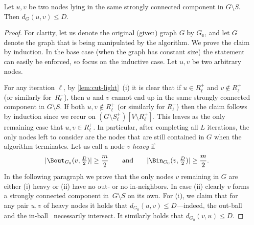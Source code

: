 \begin{lemma} \label{lem:ldd-fast-correctness}
Let $u, v$ be two nodes lying in the same strongly connected component in $G \setminus S$. Then $d_G(u, v) \leq D$.
\end{lemma}
\begin{proof}
For clarity, let us denote the original (given) graph $G$ by $G_0$, and let $G$ denote the graph that is being manipulated by the algorithm. We prove the claim by induction. In the base case (when the graph has constant size) the statement can easily be enforced, so focus on the inductive case. Let $u, v$ be two arbitrary nodes.

For any iteration $\ell$, by \cref{lem:cut-light}~(i) it is clear that if $u \in R^+_\ell$ and $v \not\in R^+_\ell$ (or similarly for~$R^-_\ell$), then $u$ and $v$ cannot end up in the same strongly connected component in $G \setminus S$. If both $u, v \not\in R^+_\ell$ (or similarly for $R^-_\ell$) then the claim follows by induction since we recur on $(G \setminus S^+_\ell)[V \setminus R^+_\ell]$. This leaves as the only remaining case that $u, v \in R^+_\ell$. In particular, after completing all $L$ iterations, the only nodes left to consider are the nodes that are still contained in $G$ when the algorithm terminates. Let us call a node $v$ \emph{heavy} if
\begin{equation*}
    |\Bout_{G_0}(v, \tfrac D2)| \geq \frac{m}{2} \qquad\text{and}\qquad |\Bin_{G_0}(v, \tfrac D2)| \geq \frac{m}{2}.
\end{equation*}
In the following paragraph we prove that the only nodes $v$ remaining in $G$ are either (i) heavy or (ii) have no out- or no in-neighbors. In case (ii) clearly $v$ forms a strongly connected component in~$G \setminus S$ on its own. For (i), we claim that for any pair $u, v$ of heavy nodes it holds that $d_{G_0}(u, v) \leq D$---indeed, the out-ball~ and the in-ball~ necessarily intersect. It similarly holds that $d_{G_0}(v, u) \leq D$.


\end{proof}
